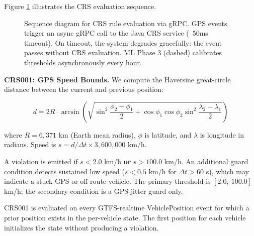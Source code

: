 Figure \ref{fig:crs-grpc-sequence} illustrates the CRS evaluation sequence.

\begin{figure}[htbp]
  \centering
  \caption{Sequence diagram for CRS rule evaluation via gRPC. GPS events trigger
    an async gRPC call to the Java CRS service (~50ms timeout). On timeout,
    the system degrades gracefully: the event passes without CRS evaluation.
    ML Phase 3 (dashed) calibrates thresholds asynchronously every hour.}
  \label{fig:crs-grpc-sequence}
\end{figure}

\textbf{CRS001: GPS Speed Bounds.} We compute the Haversine great-circle
distance between the current and previous position:

\begin{equation}
d = 2R \cdot \arcsin\!\left(
\sqrt{\sin^{2}\!\frac{\phi_{2}-\phi_{1}}{2}
+ \cos\phi_{1}\cos\phi_{2}\sin^{2}\!\frac{\lambda_{2}-\lambda_{1}}{2}}
\right)
\end{equation}

where $R = 6{,}371$ km (Earth mean radius), $\phi$ is latitude,
and $\lambda$ is longitude in radians. Speed is
$s = d / \Delta t \times 3{,}600{,}000$ km/h.

A violation is emitted if $s < 2.0$ km/h \textbf{or} $s > 100.0$ km/h.
An additional guard condition detects sustained low speed ($s < 0.5$ km/h
for $\Delta t > 60$ s), which may indicate a stuck GPS or off-route vehicle.
The primary threshold is $[2.0,\ 100.0]$ km/h; the secondary condition
is a GPS-jitter guard only.

CRS001 is evaluated on every GTFS-realtime VehiclePosition event for which
a prior position exists in the per-vehicle state. The first position for
each vehicle initializes the state without producing a violation.

